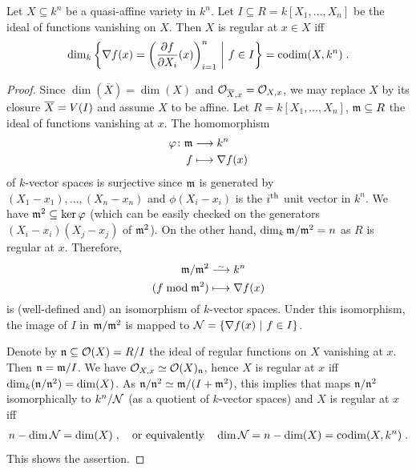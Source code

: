 \documentclass[a4paper,parskip=half,numbers=enddot, DIV=12]{scrreprt}
\begin{document}
\begin{prop}
    Let $X\subseteq k^n$ be  a quasi-affine variety in $k^n$. Let $I\subseteq R=k[X_1,\ldots,X_n]$ be the ideal of functions vanishing on $X$. Then $X$ is regular at $x\in X$ iff 
    \begin{align*}
        \dim_k \left\{\nabla f(x) = \left(\frac{\partial f}{\partial X_i}(x)\right)_{i=1}^n \ \middle|\  f\in I\right\} = \operatorname{codim}(X,k^n)\;.
    \end{align*}
\end{prop}
\begin{proof}
    Since $\dim (\overline{X}) = \dim (X)$ and $\mathcal{O}_{\overline{X},x} = \mathcal{O}_{X,x}$, we may replace $X$ by its closure $\overline{X}=V(I)$ and assume $X$ to be affine. Let $R=k[X_1,\ldots,X_n]$, $\mathfrak{m}\subseteq R$ the ideal of functions vanishing at $x$. The homomorphism
    \begin{align*}
    	\phi\colon\mm&\morphism k^n\\
    	f&\longmapsto\nabla f(x)
    \end{align*}
    of $k$-vector spaces is surjective since $\mathfrak{m}$ is generated by $(X_1-x_1),\ldots,(X_n-x_n)$ and $\phi(X_i-x_i)$ is the $i^{\text{th}}$ unit vector in $k^n$. We have $\mathfrak{m}^2\subseteq\ker\varphi$ (which can be easily checked on the generators $(X_i-x_i)(X_j-x_j)$ of $\mathfrak{m}^2$). On the other hand, $\dim_k\mathfrak{m}/\mathfrak{m}^2=n$ as $R$ is regular at $x$. Therefore,
    \begin{align}\lbl{eq:modToNabla}
	    \begin{split}
		    \mm/\mm^2 &\isomorphism k^n\\
		    (f\bmod \mm^2)&\longmapsto \nabla f(x)
	    \end{split}
    \end{align}
    is (well-defined and) an isomorphism of $k$-vector spaces. Under this isomorphism, the image of $I$ in $\mathfrak{m}/\mathfrak{m}^2$ is mapped to $\mathcal{N}=\left\{\nabla f(x) \ \middle|\  f\in I\right\}$.
    
     Denote by $\mathfrak{n}\subseteq \mathcal{O}(X)=R/I$ the ideal of regular functions on $X$ vanishing at $x$. Then $\mathfrak{n} = \mathfrak{m}/I$. We have $\mathcal{O}_{X,x} \simeq \mathcal{O}(X)_{\mathfrak{n}}$, hence $X$ is regular at $x$ iff $\dim_k(\mathfrak{n}/\mathfrak{n}^2) = \dim (X)$. As $\mathfrak{n}/\mathfrak{n}^2\simeq \mathfrak{m}/(I+\mathfrak{m}^2)$, this implies that  maps $\mathfrak{n}/\mathfrak{n}^2$ isomorphically to $k^n/\mathcal{N}$ (as a quotient of $k$-vector spaces) and $X$ is regular at $x$ iff 
     \begin{align*}
     	n-\dim\mathcal{N} = \dim (X)\;,\quad\text{or equivalently}\quad\dim \mathcal{N} =n-\dim (X) = \operatorname{codim}(X,k^n)\;.
     \end{align*}
     This shows the assertion.
\end{proof}
\end{document}
